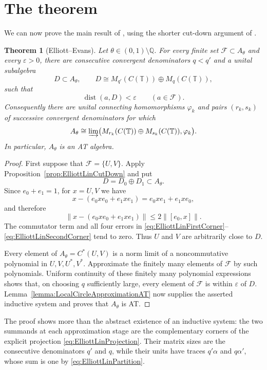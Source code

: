 \documentclass{book}
\newtheorem{theorem}[definition]{Theorem}
\begin{document}
\section{The theorem}

We can now prove the main result of \cite{ElliottEvans1993}, using the
shorter cut-down argument of \cite{ElliottLin1996}.

\begin{theorem}[Elliott--Evans]\label{thm:ElliottEvansAT}
  Let \(\theta\in(0,1)\setminus\mathbb Q\). For every finite set
  \(\mathcal F\subset A_\theta\) and every \(\varepsilon>0\), there are
  consecutive convergent denominators \(q<q'\) and a unital subalgebra
  \[
    D\subset A_\theta,
    \qquad
    D\cong M_{q'}(C(\mathbb T))\oplus M_q(C(\mathbb T)),
  \]
  such that
  \[
    \operatorname{dist}(a,D)<\varepsilon
    \qquad(a\in\mathcal F).
  \]
  Consequently there are unital connecting homomorphisms \(\varphi_k\)
  and pairs \((r_k,s_k)\) of successive convergent denominators for which
  \[
    A_\theta\cong
    \varinjlim\bigl(
      M_{r_k}(C(\mathbb T))\oplus M_{s_k}(C(\mathbb T)),
      \varphi_k
    \bigr).
  \]
  In particular, \(A_\theta\) is an AT algebra.
\end{theorem}

\begin{proof}
  First suppose that \(\mathcal F=\{U,V\}\). Apply
  Proposition~\ref{prop:ElliottLinCutDown} and put
  \[
    D=D_0\oplus D_1\subset A_\theta.
  \]
  Since \(e_0+e_1=1\), for \(x=U,V\) we have
  \[
    x-(e_0xe_0+e_1xe_1)=e_0xe_1+e_1xe_0,
  \]
  and therefore
  \[
    \lVert x-(e_0xe_0+e_1xe_1)\rVert
      \leq2\lVert[e_0,x]\rVert.
  \]
  The commutator term and all four errors in
  \eqref{eq:ElliottLinFirstCorner}--\eqref{eq:ElliottLinSecondCorner} tend
  to zero. Thus \(U\) and \(V\) are arbitrarily close to \(D\).

  Every element of \(A_\theta=C^*(U,V)\) is a norm limit of a
  noncommutative polynomial in \(U,V,U^*,V^*\). Approximate the finitely
  many elements of \(\mathcal F\) by such polynomials. Uniform continuity
  of these finitely many polynomial expressions shows that, on choosing
  \(q\) sufficiently large, every element of \(\mathcal F\) is within
  \(\varepsilon\) of \(D\). Lemma~\ref{lemma:LocalCircleApproximationAT}
  now supplies the asserted inductive system and proves that \(A_\theta\)
  is AT.
\end{proof}

The proof shows more than the abstract existence of an inductive system:
the two summands at each approximation stage are the complementary corners
of the explicit projection \eqref{eq:ElliottLinProjection}. Their matrix
sizes are the consecutive denominators \(q'\) and \(q\), while their units
have traces \(q'\alpha\) and \(q\alpha'\), whose sum is one by
\eqref{eq:ElliottLinPartition}.
\end{document}
